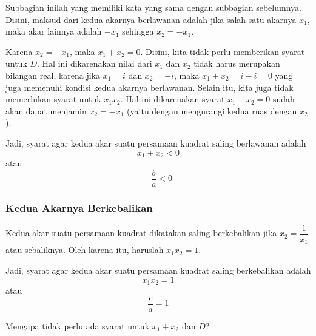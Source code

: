 		Subbagian inilah yang memiliki kata yang sama dengan subbagian sebelumnya. Disini, maksud dari kedua akarnya berlawanan adalah jika salah satu akarnya $ x_{1} $, maka akar lainnya adalah $ -x_{1} $ sehingga $ x_{2} = -x_{1} $.
		
		\par Karena $ x_{2} = -x_{1} $, maka $ x_{1} + x_{2} = 0 $. Disini, kita tidak perlu memberikan syarat untuk $ D $. Hal ini dikarenakan nilai dari $ x_{1} $ dan $ x_{2} $ tidak harus merupakan bilangan real, karena jika $ x_{1} = i $ dan $ x_{2} = -i $, maka $ x_{1} + x_{2} = i - i = 0 $ yang juga memenuhi kondisi kedua akarnya berlawanan. Selain itu, kita juga tidak memerlukan syarat untuk $ x_{1}x_{2} $. Hal ini dikarenakan syarat $ x_{1} + x_{2} = 0 $ sudah akan dapat menjamin $ x_{2} = -x_{1} $ (yaitu dengan mengurangi kedua ruas dengan $ x_{2} $).
		
		\par Jadi, syarat agar kedua akar suatu persamaan kuadrat saling berlawanan adalah
		\begin{equation} \label{eq:219}
			x_{1} + x_{2} < 0
		\end{equation}
		atau
		\[ -\frac{b}{a} < 0 \]
	
	\subsubsection{Kedua Akarnya Berkebalikan}
		
		Kedua akar suatu persamaan kuadrat dikatakan saling berkebalikan jika $ x_{2} = \dfrac{1}{x_{1}} $ atau sebaliknya. Oleh karena itu, haruslah $ x_{1}x_{2} = 1 $.
		
		\par Jadi, syarat agar kedua akar suatu persamaan kuadrat saling berkebalikan adalah
		\begin{equation} \label{eq:220}
			x_{1}x_{2} = 1
		\end{equation}
		atau
		\[ \frac{c}{a} = 1 \]
		
		\begin{explbox}
			Mengapa tidak perlu ada syarat untuk $ x_{1} + x_{2} $ dan $ D $?
		\end{explbox}
	
